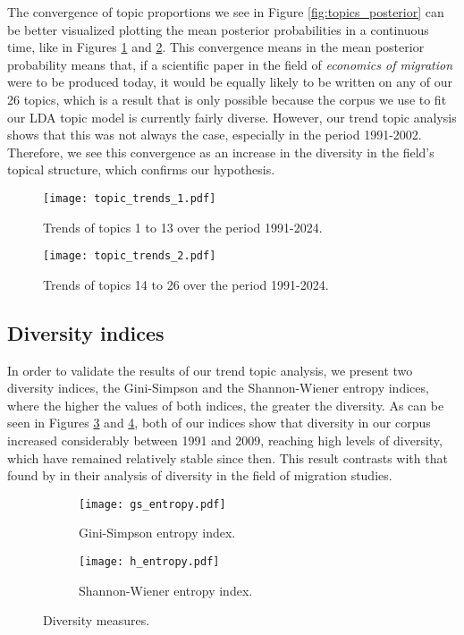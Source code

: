 The convergence of topic proportions we see in Figure \ref{fig:topics_posterior} can be better visualized plotting the mean posterior probabilities in a continuous time, like in Figures \ref{fig:topic_trends_1} and \ref{fig:topic_trends_2}. This convergence means in the mean posterior probability means that, if a scientific paper in the field of \textit{economics of migration} were to be produced today, it would be equally likely to be written on any of our 26 topics, which is a result that is only possible because the corpus we use to fit our LDA topic model is currently fairly diverse. However, our trend topic analysis shows that this was not always the case, especially in the period 1991-2002. Therefore, we see this convergence as an increase in the diversity in the field's topical structure, which confirms our hypothesis.

\begin{figure}[ht!]
	\centering
	\texttt{[image: topic\_trends\_1.pdf]}
	\caption{Trends of topics 1 to 13 over the period 1991-2024.}
	\label{fig:topic_trends_1}
\end{figure}

\begin{figure}[ht!]
	\centering
	\texttt{[image: topic\_trends\_2.pdf]}
	\caption{Trends of topics 14 to 26 over the period 1991-2024.}
	\label{fig:topic_trends_2}
\end{figure}

\subsection{Diversity indices} \label{results_diversity_indices}

In order to validate the results of our trend topic analysis, we present two diversity indices, the Gini-Simpson and the Shannon-Wiener entropy indices, where the higher the values of both indices, the greater the diversity. As can be seen in Figures \ref{fig:gini_simpson_entropy} and \ref{fig:shannon_wiener_entropy}, both of our indices show that diversity in our corpus increased considerably between 1991 and 2009, reaching high levels of diversity, which have remained relatively stable since then. This result contrasts with that found by \cite[p. 467]{pisarevskaya_mapping_2020} in their analysis of diversity in the field of migration studies.

\begin{figure}[ht!]
	\centering
	\begin{subfigure}{0.49\textwidth}
		\centering
		\texttt{[image: gs\_entropy.pdf]}
		\caption{Gini-Simpson entropy index.}
		\label{fig:gini_simpson_entropy}
	\end{subfigure}
	\hfill
	\begin{subfigure}{0.49\textwidth}
		\centering
		\texttt{[image: h\_entropy.pdf]}
		\caption{Shannon-Wiener entropy index.}
		\label{fig:shannon_wiener_entropy}
	\end{subfigure}
\caption{Diversity measures.}
\label{fig:diversity_indices}
\end{figure}
